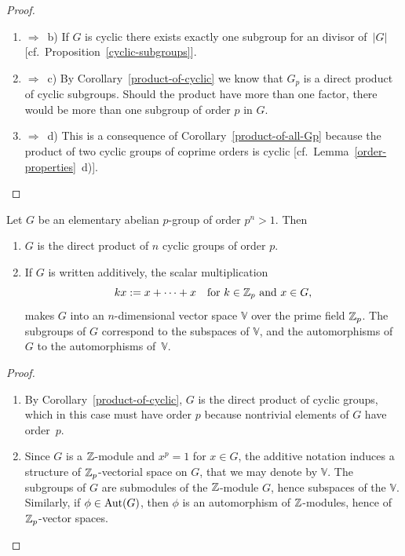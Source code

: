 \begin{proof}${}$
\begin{enumerate}[\upshape a)]
    \item $\Rightarrow$~b) If $G$ is cyclic there exists exactly one subgroup for an divisor of~$|G|$ [cf.~Proposition~\ref{cyclic-subgroups}].

    \item $\Rightarrow$~c) By Corollary~\ref{product-of-cyclic} we know that $G_p$ is a direct product of cyclic subgroups. Should the product have more than one factor, there would be more than one subgroup of order $p$ in $G$.

    \item $\Rightarrow$~d) This is a consequence of Corollary~\ref{product-of-all-Gp} because the product of two cyclic groups of coprime orders is cyclic [cf.~Lemma~\ref{order-properties}~d)].
\end{enumerate}
\end{proof}

\begin{thm}
    Let\/ $G$ be an elementary abelian\/ $p$-group of order\/ $p^n > 1$. Then
    \begin{enumerate}[\upshape a)]
    \item $G$ is the direct product of\/ $n$ cyclic groups of order\/ $p$.
    \item If\/ $G$ is written additively, the scalar multiplication
    $$
        kx := x + \cdots + x \quad \text{for } k \in \mathbb{Z}_p \text{ and } x \in G,
    $$
    makes\/ $G$ into an\/ $n$-dimensional vector space\/ $\mathbb V$ over the prime field\/ $\mathbb{Z}_p$. The subgroups of\/ $G$ correspond to the subspaces of\/ $\mathbb V$, and the automorphisms of\/ $G$ to the automorphisms of\/~$\mathbb V$.
    \end{enumerate}
\end{thm}

\begin{proof}${}$
\begin{enumerate}[\upshape a)]
    \item By Corollary~\ref{product-of-cyclic}, $G$ is the direct product of cyclic groups, which in this case must have order $p$ because nontrivial elements of $G$ have order~$p$.

    \item Since $G$ is a $\mathbb{Z}$-module and $x^p=1$ for $x\in G$, the additive notation induces a structure of $\mathbb{Z}_p$-vectorial space on $G$, that we may denote by $\mathbb V$. The subgroups of $G$ are submodules of the $\mathbb{Z}$-module $G$, hence subspaces of the $\mathbb V$. Similarly, if $\phi\in{\rm Aut}(G)$, then $\phi$ is an automorphism of $\mathbb{Z}$-modules, hence of $\mathbb{Z}_p$-vector spaces.
\end{enumerate}
\end{proof}

